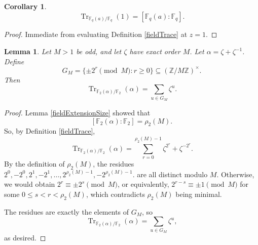 \documentclass[a4paper]{article}
\newtheorem{lemma}[theorem]{Lemma}
\newtheorem{corollary}[theorem]{Corollary}
\newcommand{\F}{\mathbb{F}}
\newcommand{\Z}{\mathbb{Z}}
\newcommand{\Tr}[2][]{\operatorname{Tr}_{#1}\!\left( #2 \right)}
\begin{document}
	\begin{corollary}\label{traceAt1}
		\begin{equation*}
			\Tr[\F_q(a) / \F_q]{1} = \left[\F_q(a) : \F_q\right].
		\end{equation*}
	\end{corollary}
	\begin{proof}
		Immediate from evaluating Definition \ref{fieldTrace} at $z=1$.
	\end{proof}
	
	\begin{lemma}\label{fieldTraceSumRoots}
		Let $M > 1$ be odd, and let $\zeta$ have exact order $M$.
		Let $\alpha = \zeta + \zeta^{-1}$.
		Define
		\begin{equation*}
			G_M = \{\pm 2^r \pmod{M} : r \geq 0\} \subseteq (\Z / M\Z)^{\times}.
		\end{equation*}
		Then
		\begin{equation*}
			\Tr[\F_2(\alpha) / \F_2]{\alpha} = \sum_{u \in G_M}{\zeta^{u}}.
		\end{equation*}
	\end{lemma}
	\begin{proof}
		Lemma \ref{fieldExtensionSize} showed that
		\begin{equation*}
			\left[\F_2(\alpha) : \F_2\right] = \rho_2(M).
		\end{equation*}
		So, by Definition \ref{fieldTrace},
		\begin{equation*}
			\Tr[\F_2(\alpha) / \F_2]{\alpha} = \sum_{r=0}^{\rho_2(M)-1}{\zeta^{2^r} + \zeta^{-2^r}}.
		\end{equation*}
		By the definition of $\rho_2(M)$, the residues $2^0, -2^0, 2^1, -2^1, \ldots, 2^{\rho_2(M)-1}, -2^{\rho_2(M)-1}$. are all distinct modulo $M$.
		Otherwise, we would obtain $2^r \equiv \pm 2^s \pmod M$, or equivalently, $2^{r-s} \equiv \pm 1 \pmod M$ for some $0 \leq s < r < \rho_2(M)$, which contradicts $\rho_2(M)$ being minimal.
	
		The residues are exactly the elements of $G_M$, so
		\begin{equation*}
			\Tr[\F_2(\alpha) / \F_2]{\alpha} = \sum_{u \in G_M}{\zeta^u},
		\end{equation*}
		as desired.
	\end{proof}
\end{document}
